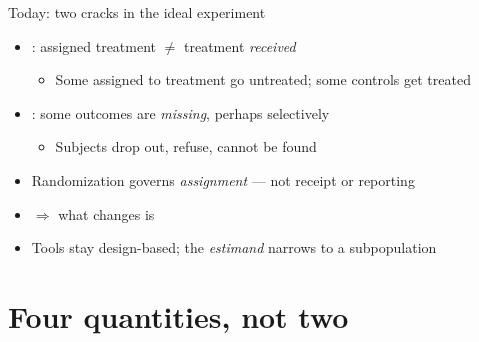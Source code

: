 \documentclass[table, xcolor = {dvipsnames}, 9pt]{beamer}
\theoremstyle{plain}
\newcommand{\mh}[1]{{\color{magenta}{#1}}}
\begin{document}
\begin{frame}[t]{Today: two cracks in the ideal experiment}
\vfill
\begin{itemize} \vfill
\item \mh{Noncompliance}: assigned treatment $\neq$ treatment \emph{received} \vfill
\begin{itemize} \vfill
\item Some assigned to treatment go untreated; some controls get treated \vfill
\end{itemize} \vfill
\item \mh{Attrition}: some outcomes are \emph{missing}, perhaps selectively \vfill
\begin{itemize} \vfill
\item Subjects drop out, refuse, cannot be found \vfill
\end{itemize} \vfill
\item Randomization governs \emph{assignment} --- not receipt or reporting \vfill
\item[] $\Rightarrow$ what changes is \mh{which causal effect we can identify} \vfill
\item Tools stay design-based; the \emph{estimand} narrows to a subpopulation \vfill
\end{itemize} \vfill
\end{frame}
\section{Four quantities, not two}
\end{document}
